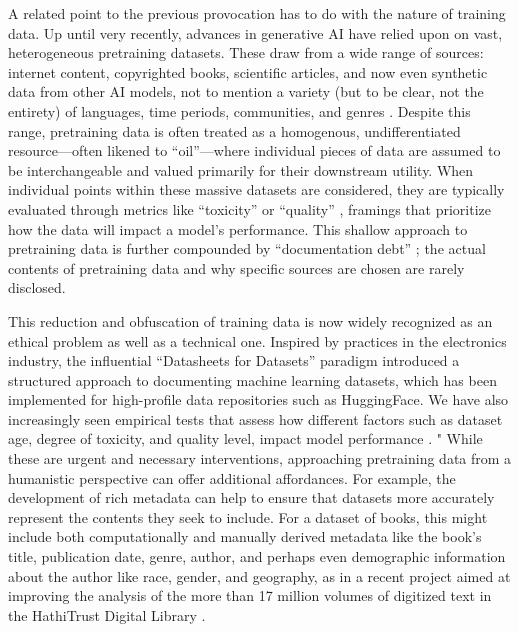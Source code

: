 A related point to the previous provocation has to do with the nature of training data. Up until very recently, advances in generative AI have relied upon on vast, heterogeneous pretraining datasets. These draw from a wide range of sources: internet content, copyrighted books, scientific articles, and now even synthetic data from other AI models, not to mention a variety (but to be clear, not the entirety) of languages, time periods, communities, and genres \cite{Anil_Dai_Firat_Johnson_Lepikhin_Passos_Shakeri_Taropa_Bailey_Chen_etal._2023,brown_language_2020,nostalgebraist_2022}. Despite this range, pretraining data is often treated as a homogenous, undifferentiated resource—often likened to ``oil''—where individual pieces of data are assumed to be interchangeable and valued primarily for their downstream utility. When individual points within these massive datasets are considered, they are typically evaluated through metrics like ``toxicity'' or ``quality'' \citep{Lucy_Gururangan_Soldaini_Strubell_Bamman_Klein_Dodge_2024}, framings that prioritize how the data will impact a model’s performance. This shallow approach to pretraining data is further compounded by  ``documentation debt'' \cite{Bandy_Vincent_2021}; the actual contents of pretraining data and why specific sources are chosen are rarely disclosed. 

This reduction and obfuscation of training data is now widely recognized as an ethical problem as well as a technical one. Inspired by practices in the electronics industry, the influential ``Datasheets for Datasets'' \cite{Gebru_Morgenstern_Vecchione_Vaughan_Wallach_III_Crawford_2021} paradigm introduced a structured approach to documenting machine learning datasets, which has been implemented for high-profile data repositories such as HuggingFace. We have also increasingly seen empirical tests that assess how different factors such as dataset age, degree of toxicity, and quality level, impact model performance \cite{longpre-etal-2024-pretrainers}. " While these are urgent and necessary interventions, approaching pretraining data from a humanistic perspective can offer additional affordances. For example, the development of rich metadata can help to ensure that datasets more accurately represent the contents they seek to include. For a dataset of books, this might include both computationally and manually derived metadata like the book’s title, publication date, genre, author, and perhaps even demographic information about the author like race, gender, and geography, as in a recent project aimed at improving the analysis of the more than 17 million volumes of digitized text in the HathiTrust Digital Library \cite{underwood_page-level_2014,Underwood_Kimutis_Witte_2020}. 

